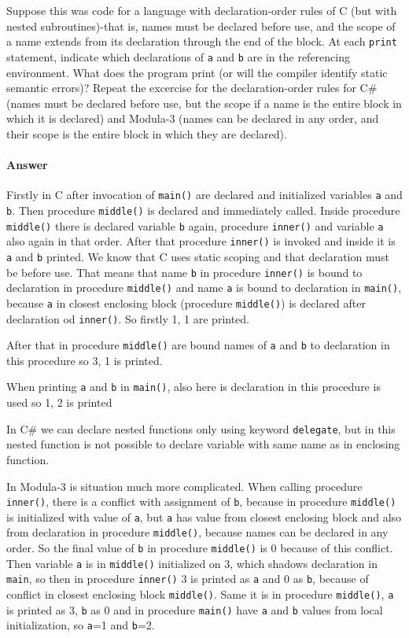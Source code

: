 \documentclass[5pt]{article}
\begin{document}
Suppose this was code for a language with declaration-order rules of C (but
with nested subroutines)-that is, names must be declared before use, and the
scope of a name extends from its declaration through the end of the block. At
each \verb|print| statement, indicate which declarations of \verb|a| and
\verb|b| are in the referencing environment. What does the program print (or
will the compiler identify static semantic errors)? Repeat the excercise for the
declaration-order rules for C\# (names must be declared before use, but the
scope if a name is the entire block in which it is declared) and Modula-3
(names can be declared in any order, and their scope is the entire block in
which they are declared).

\paragraph{Answer}
Firstly in C after invocation of \verb|main()| are declared and initialized
variables \verb|a| and \verb|b|. Then procedure \verb|middle()| is declared and
immediately called. Inside procedure \verb|middle()| there is declared variable
\verb|b| again, procedure \verb|inner()| and variable \verb|a| also again in
that order. After that procedure \verb|inner()| is invoked and inside it is
\verb|a| and \verb|b| printed. We know that C uses static scoping and that
declaration must be before use. That means that name \verb|b| in procedure
\verb|inner()| is bound to declaration in procedure \verb|middle()| and name
\verb|a| is bound to declaration in \verb|main()|, because \verb|a| in closest
enclosing block (procedure \verb|middle()|) is declared after declaration od
\verb|inner()|. So firstly 1, 1 are printed.



After that in procedure \verb|middle()| are bound names of \verb|a| and \verb|b|
to declaration in this procedure so 3, 1 is printed.

When printing \verb|a| and \verb|b| in \verb|main()|, also here is declaration
in this procedure is used so 1, 2 is printed


In C\# we can declare nested functions only using keyword \verb|delegate|, but
in this nested function is not possible to declare variable with same name as in
enclosing function.

In Modula-3 is situation much more complicated. When calling procedure
\verb|inner()|, there is a conflict with assignment of \verb|b|, because in
procedure \verb|middle()| is initialized with value of \verb|a|, but \verb|a|
has value from closest enclosing block and also from declaration in procedure
\verb|middle()|, because names can be declared in any order. So the final value
of \verb|b| in procedure \verb|middle()| is 0 because of this conflict. Then
variable \verb|a| is in \verb|middle()| initialized on 3, which shadows
declaration in \verb|main|, so then in procedure \verb|inner()| 3 is printed as
\verb|a| and 0 as \verb|b|, because of conflict in closest enclosing block
\verb|middle()|. Same it is in procedure \verb|middle()|, \verb|a| is printed as
3, \verb|b| as 0 and in procedure \verb|main()| have \verb|a| and \verb|b|
values from local initialization, so \verb|a|=1 and \verb|b|=2.
\setcounter{subsection}{13}
\end{document}
